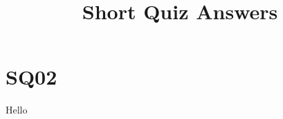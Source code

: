 \documentclass[12pt]{report}
\title{Short Quiz Answers}
\begin{document}
\section{SQ02}

\textnormal{Hello}
\end{document}
